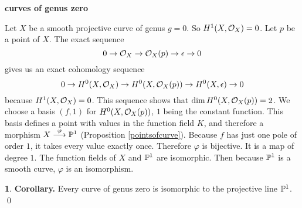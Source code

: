 \documentclass[leqno]{book}
\newcommand\Marginnote[1]{\marginnote{\hspace{-12pt}\normalfont{#1}}}
\renewcommand\theequation{\thesection.\arabic{equation}}
\newenvironment{boldequation}{\renewcommand\theequation{\textbf{\thesection.\arabic{equation}}}\equation}
   {\endequation}
\theoremstyle{definition}%
\numberwithin{equation}{section}
\theoremstyle{theorem} %
\newtheorem{corollary}[equation]{}
\begin{document}
\bsno
\begin{boldequation}\hspace{-9cm}\textbf{curves of genus zero}
\Marginnote{gzero}\label{gzero}\end{boldequation}

\bsno Let $X$ be a smooth projective curve of genus $g=
0$.  So $H^1(X,\co_X)=0$.  Let $p$ be a point of $X$.  The exact sequence
$$0 \ar \co_X \ar \co_X(p) \ar \epsilon \ar 0$$ 
 gives us an exact cohomology sequence 
$$0 \ar H^0(X,\co_X) \ar H^0(X,\co_X(p)) \ar H^0(X,\epsilon) \ar 0$$
 because $H^1(X,\co_X)=0$.  This sequence shows that $\dim
 H^0(X,\co_X(p))=2$.  We choose a basis $(f,1)$ for $H^0(X,\co_X(p))$,
 $1$ being the constant function.  This basis defines a point with
 values in the function field $K$, and therefore a morphism $X
 \stackrel{\varphi}\longrightarrow \mathbb{P}^1$ (Proposition \ref{pointsofcurve}).
 Because $f$ has just one pole of order $1$, it takes every value
 exactly once.  Therefore $\varphi$ is bijective.  It is a map of
 degree $1$.  The function fields of $X$ and $\mathbb{P}^1$ are isomorphic.
 Then because $\mathbb{P}^1$ is a smooth curve, $\varphi$ is an isomorphism.

\begin{corollary}{\bf Corollary.} \label{genuszero}\Marginnote{genuszero}
 Every curve of genus zero is
isomorphic to the projective line $\mathbb{P}^1$.  \qed\end{corollary}
\end{document}
